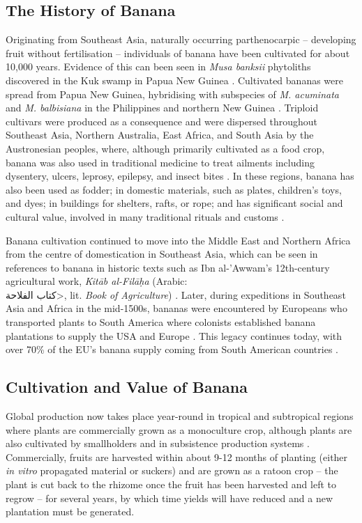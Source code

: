 \subsection{The History of Banana}

Originating from Southeast Asia, naturally occurring parthenocarpic – developing fruit without fertilisation – individuals of banana have been cultivated for about 10,000 years. Evidence of this can been seen in \textit{Musa banksii} phytoliths discovered in the Kuk swamp in Papua New Guinea \parencite{Denham2011}. Cultivated bananas were spread from Papua New Guinea, hybridising with subspecies of \textit{M. acuminata} and \textit{M. balbisiana} in the Philippines and northern New Guinea \parencite{Perrier2009}. Triploid cultivars were produced as a consequence and were dispersed throughout Southeast Asia, Northern Australia, East Africa, and South Asia by the Austronesian peoples, where, although primarily cultivated as a food crop, banana was also used in traditional medicine to treat ailments including dysentery, ulcers, leprosy, epilepsy, and insect bites \parencite{Kumar2012}. In these regions, banana has also been used as fodder; in domestic materials, such as plates, children’s toys, and dyes; in buildings for shelters, rafts, or rope; and has significant social and cultural value, involved in many traditional rituals and customs \parencite{Hapsari2017}.  

Banana cultivation continued to move into the Middle East and Northern Africa from the centre of domestication in Southeast Asia, which can be seen in references to banana in historic texts such as Ibn al-'Awwam's 12th-century agricultural work, \textit{Kit\=ab al-Fil\=a\d{h}a} (Arabic:\\ \<كتاب الفلاحة>, lit. \textit{Book of Agriculture}) \parencite{Clement1866}. Later, during expeditions in Southeast Asia and Africa in the mid-1500s, bananas were encountered by Europeans who transported plants to South America where colonists established banana plantations to supply the USA and Europe \parencite{Guzman-Rivas1960, Salas-Pascual2022}. This legacy continues today, with over 70\% of the EU’s banana supply coming from South American countries \parencite{EuropeanUnion2022}.  

\subsection{Cultivation and Value of Banana}
\label{sec:cultivation}

Global production now takes place year-round in tropical and subtropical regions where plants are commercially grown as a monoculture crop, although plants are also cultivated by smallholders and in subsistence production systems \parencite{Viljoen2020}. Commercially, fruits are harvested within about 9-12 months of planting (either\textit{ in vitro} propagated material or suckers) and are grown as a ratoon crop – the plant is cut back to the rhizome once the fruit has been harvested and left to regrow – for several years, by which time yields will have reduced and a new plantation must be generated. 

